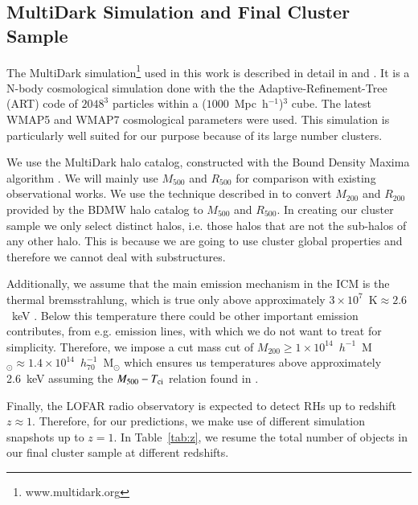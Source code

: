 \documentclass[traditabstract]{aa}
\newcommand{\rmn}{\mathrm}
\begin{document}
\subsection{MultiDark Simulation and Final Cluster Sample}
\label{sec:2.1}
The MultiDark simulation\footnote[3]{www.multidark.org} used in this work is described in 
detail in \cite{2011arXiv1104.5130P} and \cite{2011arXiv1109.0003R}.  It is a N-body cosmological simulation 
done with the the Adaptive-Refinement-Tree (ART) code \citep{1997ApJS..111...73K} of $2048^3$ particles within
a ($1000$~Mpc~h$^{-1}$)$^3$ cube. The latest WMAP5 and WMAP7 cosmological parameters 
were used. This simulation is particularly  well suited for our purpose because of its large number clusters. 
 
We use the MultiDark halo catalog, constructed with the Bound Density Maxima algorithm \citep{1997astro.ph.12217K}.
We will mainly use $M_{500}$ and $R_{500}$ for comparison with existing observational works. 
We use the technique described in \cite{2003ApJ...584..702H} to convert $M_{200}$ and $R_{200}$ provided by the BDMW halo catalog to $M_{500}$ and $R_{500}$.
In creating our cluster sample we only select distinct halos, i.e. those halos that are not the sub-halos
of any other halo. This is because we are going to use cluster global properties and therefore we cannot
deal with substructures.

Additionally, we assume that the main emission mechanism in the ICM is the thermal bremsstrahlung, which is true only above approximately $3\times10^{7}$~$\rmn{K}\approx2.6$~keV \citep{1988xrec.book.....S}. Below this temperature there could be other important emission contributes, from e.g. emission lines, with which we do not want to treat for simplicity. Therefore, we impose a cut mass cut of $M_{200}\geq1\times10^{14}$~$h^{-1}$~M$_{\odot}\approx1.4\times10^{14}$~$h_{70}^{-1}$~M$_{\odot}$ which ensures us temperatures above approximately 2.6~keV assuming the $M_{500} - T_{\rm{ci}}$ relation found in \cite{2010MNRAS.406.1773M}.

Finally, the LOFAR radio observatory is expected to detect RHs up to redshift $z \approx 1$. Therefore, for our predictions, we make use of different simulation snapshots up
to $z=1$. In Table~\ref{tab:z}, we resume the total number of objects in our final cluster sample at different redshifts.
\end{document}
